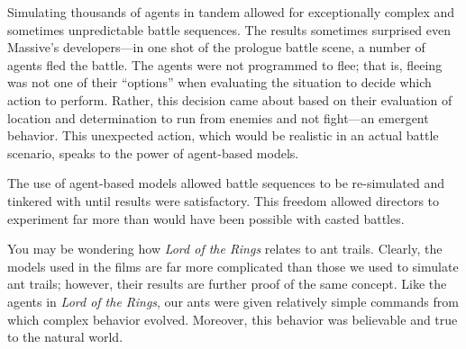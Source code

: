 Simulating thousands of agents in tandem allowed for exceptionally complex and sometimes unpredictable battle sequences.  The results sometimes surprised even Massive's developers---in one shot of the prologue battle scene, a number of agents fled the battle.  The agents were not programmed to flee; that is, fleeing was not one of their ``options'' when evaluating the situation to decide which action to perform.  Rather, this decision came about based on their evaluation of location and determination to run from enemies and not fight---an emergent behavior. This unexpected action, which would be realistic in an actual battle scenario, speaks to the power of agent-based models.  

The use of agent-based models allowed battle sequences to be re-simulated and tinkered with until results were satisfactory.  This freedom allowed directors to experiment far more than would have been possible with casted battles.

You may be wondering how \emph{Lord of the Rings} relates to ant trails.  Clearly, the models used in the films are far more complicated than those we used to simulate ant trails; however, their results are further proof of the same concept.  Like the agents in \emph{Lord of the Rings}, our ants were given relatively simple commands from which complex behavior evolved.  Moreover, this behavior was believable and true to the natural world. 

















